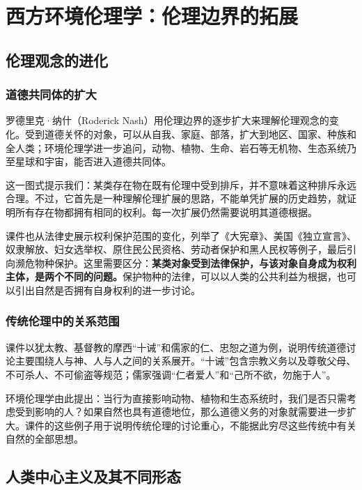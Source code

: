\documentclass{ctexart}
\begin{document}
\section{西方环境伦理学：伦理边界的拓展}

\subsection{伦理观念的进化}

\subsubsection{道德共同体的扩大}

罗德里克·纳什（Roderick Nash）用伦理边界的逐步扩大来理解伦理观念的变化。受到道德关怀的对象，可以从自我、家庭、部落，扩大到地区、国家、种族和全人类；环境伦理学进一步追问，动物、植物、生命、岩石等无机物、生态系统乃至星球和宇宙，能否进入道德共同体。

这一图式提示我们：某类存在物在既有伦理中受到排斥，并不意味着这种排斥永远合理。不过，它首先是一种理解伦理扩展的思路，不能单凭扩展的历史趋势，就证明所有存在物都拥有相同的权利。每一次扩展仍然需要说明其道德根据。

课件也从法律史展示权利保护范围的变化，列举了《大宪章》、美国《独立宣言》、奴隶解放、妇女选举权、原住民公民资格、劳动者保护和黑人民权等例子，最后引向濒危物种保护。这里需要区分：\textbf{某类对象受到法律保护，与该对象自身成为权利主体，是两个不同的问题。}保护物种的法律，可以以人类的公共利益为根据，也可以引出自然是否拥有自身权利的进一步讨论。

\subsubsection{传统伦理中的关系范围}

课件以犹太教、基督教的摩西“十诫”和儒家的仁、忠恕之道为例，说明传统道德讨论主要围绕人与神、人与人之间的关系展开。“十诫”包含宗教义务以及尊敬父母、不可杀人、不可偷盗等规范；儒家强调“仁者爱人”和“己所不欲，勿施于人”。

环境伦理学由此提出：当行为直接影响动物、植物和生态系统时，我们是否只需考虑受到影响的人？如果自然也具有道德地位，那么道德义务的对象就需要进一步扩大。课件的这些例子用于说明传统伦理的讨论重心，不能据此穷尽这些传统中有关自然的全部思想。

\subsection{人类中心主义及其不同形态}
\end{document}
